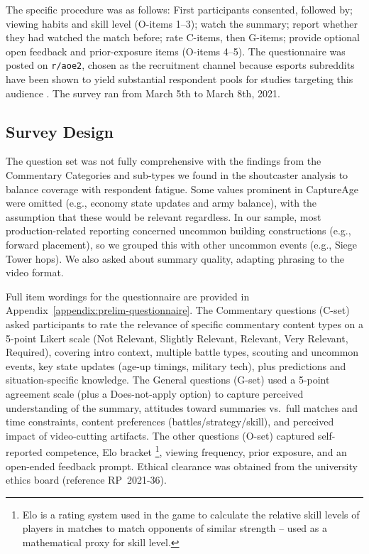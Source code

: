 The specific procedure was as follows: First participants consented, followed by; viewing habits and skill level (O-items 1--3); watch the summary; report whether they had watched the match before; rate C-items, then G-items; provide optional open feedback and prior-exposure items (O-items 4--5). The questionnaire was posted on \texttt{r/aoe2}, chosen as the recruitment channel because esports subreddits have been shown to yield substantial respondent pools for studies targeting this audience \cite{hamari2017, bidermayer2020}. The survey ran from March 5th to March 8th, 2021.

\subsection{Survey Design}
The question set was not fully comprehensive with the findings from the Commentary Categories and sub-types we found in the shoutcaster analysis to balance coverage with respondent fatigue. Some values prominent in CaptureAge were omitted (e.g., economy state updates and army balance), with the assumption that these would be relevant regardless. In our sample, most production-related reporting concerned uncommon building constructions (e.g., forward placement), so we grouped this with other uncommon events (e.g., Siege Tower hops). We also asked about summary quality, adapting phrasing to the video format.

Full item wordings for the questionnaire are provided in Appendix~\ref{appendix:prelim-questionnaire}. The Commentary questions (C-set) asked participants to rate the relevance of specific commentary content types on a 5-point Likert scale (Not Relevant, Slightly Relevant, Relevant, Very Relevant, Required), covering intro context, multiple battle types, scouting and uncommon events, key state updates (age-up timings, military tech), plus predictions and situation-specific knowledge. The General questions (G-set) used a 5-point agreement scale (plus a Does-not-apply option) to capture perceived understanding of the summary, attitudes toward summaries vs.\ full matches and time constraints, content preferences (battles/strategy/skill), and perceived impact of video-cutting artifacts. The other questions (O-set) captured self-reported competence, Elo bracket \footnote{Elo is a rating system used in the game to calculate the relative skill levels of players in matches to match opponents of similar strength -- used as a mathematical proxy for skill level.}, viewing frequency, prior exposure, and an open-ended feedback prompt.
Ethical clearance was obtained from the university ethics board (reference RP~2021-36).

